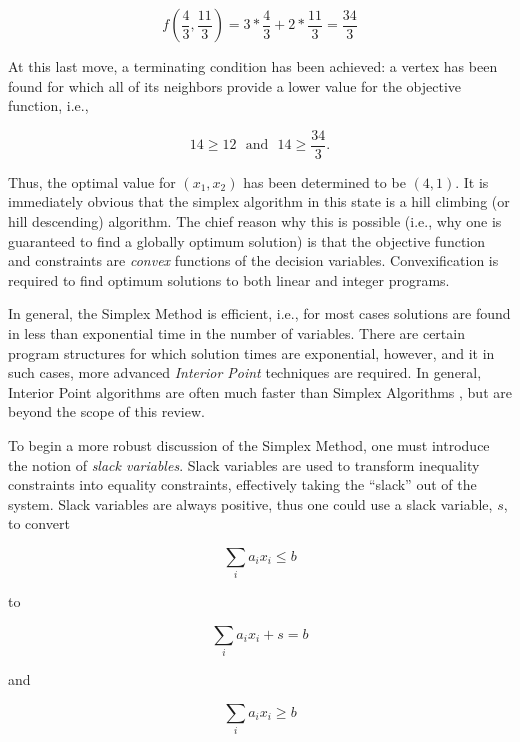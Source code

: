 \begin{equation}
    f(\frac{4}{3}, \frac{11}{3}) = 3 * \frac{4}{3} + 2 * \frac{11}{3} = \frac{34}{3} 
\end{equation}

At this last move, a terminating condition has been achieved: a vertex has been
found for which all of its neighbors provide a lower value for the objective
function, i.e.,

\begin{equation}
    14 \geq 12 \:\:\: \text{and} \:\:\: 14 \geq \frac{34}{3}.
\end{equation}

Thus, the optimal value for $(x_1, x_2)$ has been determined to be $(4, 1)$. It
is immediately obvious that the simplex algorithm in this state is a hill
climbing (or hill descending) algorithm. The chief reason why this is possible
(i.e., why one is guaranteed to find a globally optimum solution) is that the
objective function and constraints are \textit{convex} functions of the decision
variables. Convexification is required to find optimum solutions to both linear
and integer programs.

In general, the Simplex Method is efficient, i.e., for most cases solutions are
found in less than exponential time in the number of variables. There are
certain program structures for which solution times are exponential, however,
and it in such cases, more advanced \textit{Interior Point} techniques are
required. In general, Interior Point algorithms are often much faster than
Simplex Algorithms \cite{ferris_linear_2008}, but are beyond the scope of this
review.

To begin a more robust discussion of the Simplex Method, one must introduce the
notion of \textit{slack variables}. Slack variables are used to transform
inequality constraints into equality constraints, effectively taking the
``slack'' out of the system. Slack variables are always positive, thus one could
use a slack variable, $s$, to convert

\begin{equation}
  \sum_{i} a_i x_i \leq b
\end{equation}

to 

\begin{equation}
  \sum_{i} a_i x_i + s = b
\end{equation}

and

\begin{equation}
  \sum_{i} a_i x_i \geq b
\end{equation}

